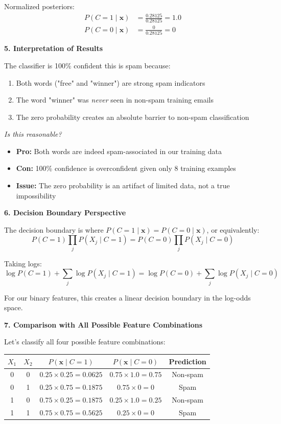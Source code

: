 \documentclass[12pt]{article}
\begin{document}
\begin{explanation}
Normalized posteriors:
\begin{align}
P(C = 1 \mid \mathbf{x}) &= \frac{0.28125}{0.28125} = 1.0 \\
P(C = 0 \mid \mathbf{x}) &= \frac{0}{0.28125} = 0
\end{align}

\textbf{5. Interpretation of Results}

The classifier is 100\% confident this is spam because:
\begin{enumerate}
    \item Both words ("free" and "winner") are strong spam indicators
    \item The word "winner" was \textit{never} seen in non-spam training emails
    \item The zero probability creates an absolute barrier to non-spam classification
\end{enumerate}

\textit{Is this reasonable?}
\begin{itemize}
    \item \textbf{Pro:} Both words are indeed spam-associated in our training data
    \item \textbf{Con:} 100\% confidence is overconfident given only 8 training examples
    \item \textbf{Issue:} The zero probability is an artifact of limited data, not a true impossibility
\end{itemize}

\textbf{6. Decision Boundary Perspective}

The decision boundary is where $P(C = 1 \mid \mathbf{x}) = P(C = 0 \mid \mathbf{x})$, or equivalently:
\[
P(C = 1) \prod_j P(X_j \mid C = 1) = P(C = 0) \prod_j P(X_j \mid C = 0)
\]

Taking logs:
\[
\log P(C = 1) + \sum_j \log P(X_j \mid C = 1) = \log P(C = 0) + \sum_j \log P(X_j \mid C = 0)
\]

For our binary features, this creates a linear decision boundary in the log-odds space.

\textbf{7. Comparison with All Possible Feature Combinations}

Let's classify all four possible feature combinations:

\begin{center}
\begin{tabular}{|c|c|c|c|c|}
\hline
$X_1$ & $X_2$ & $P(\mathbf{x} \mid C=1)$ & $P(\mathbf{x} \mid C=0)$ & Prediction \\
\hline
0 & 0 & $0.25 \times 0.25 = 0.0625$ & $0.75 \times 1.0 = 0.75$ & Non-spam \\
0 & 1 & $0.25 \times 0.75 = 0.1875$ & $0.75 \times 0 = 0$ & Spam \\
1 & 0 & $0.75 \times 0.25 = 0.1875$ & $0.25 \times 1.0 = 0.25$ & Non-spam \\
1 & 1 & $0.75 \times 0.75 = 0.5625$ & $0.25 \times 0 = 0$ & Spam \\
\hline
\end{tabular}
\end{center}


\end{explanation}
\end{document}
